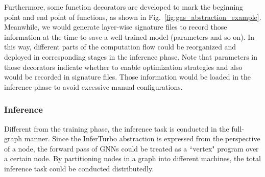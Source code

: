 \documentclass[conference]{IEEEtran}
\begin{document}

Furthermore, some function decorators are developed to mark the beginning point and end point of functions, as shown in Fig.~\ref{fig:gas_abstraction_example}.
Meanwhile, we would generate layer-wise signature files to record those information at the time to save a well-trained model  (parameters and so on). 
In this way, different parts of the computation flow could be reorganized and deployed in corresponding stages in the inference phase.
Note that parameters in those decorators indicate whether to enable optimization strategies and also would be recorded in signature files.
Those information would be loaded in the inference phase to avoid excessive manual configurations.

\subsubsection{Inference}
Different from the training phase, the inference task is conducted in the full-graph manner.
Since the InferTurbo abstraction is expressed from the perspective of a node, the forward pass of GNNs could be treated as a ``vertex" program over a certain node.
By partitioning nodes in a graph into different machines, the total inference task could be conducted distributedly.
\end{document}
